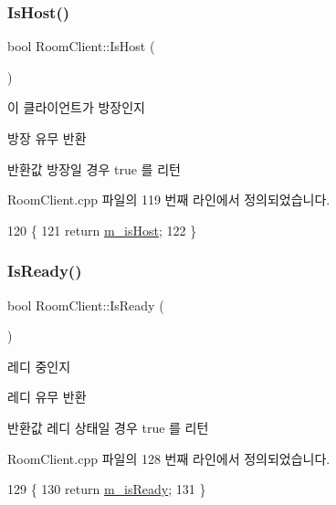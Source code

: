 \subsubsection{\texorpdfstring{Is\+Host()}{IsHost()}}
{\footnotesize\ttfamily bool Room\+Client\+::\+Is\+Host (\begin{DoxyParamCaption}{ }\end{DoxyParamCaption})}



이 클라이언트가 방장인지 

방장 유무 반환

\begin{DoxyReturn}{반환값}
방장일 경우 true 를 리턴 
\end{DoxyReturn}


Room\+Client.\+cpp 파일의 119 번째 라인에서 정의되었습니다.


\begin{DoxyCode}
120 \{
121     \textcolor{keywordflow}{return} \hyperlink{class_room_client_a09df06af0caa37c9ee7d3b91fe80b317}{m\_isHost};
122 \}
\end{DoxyCode}
\mbox{\label{class_room_client_acd23b894bb8090e89d1bd7163c1db395}} 
\subsubsection{\texorpdfstring{Is\+Ready()}{IsReady()}}
{\footnotesize\ttfamily bool Room\+Client\+::\+Is\+Ready (\begin{DoxyParamCaption}{ }\end{DoxyParamCaption})}



레디 중인지 

레디 유무 반환

\begin{DoxyReturn}{반환값}
레디 상태일 경우 true 를 리턴 
\end{DoxyReturn}


Room\+Client.\+cpp 파일의 128 번째 라인에서 정의되었습니다.


\begin{DoxyCode}
129 \{ 
130     \textcolor{keywordflow}{return} \hyperlink{class_room_client_a09fb4ef6ca643e53d68ad771761e8289}{m\_isReady}; 
131 \}
\end{DoxyCode}
\mbox{\label{class_room_client_adc646ab59c5581d2f15b117d4eb51987}} 
